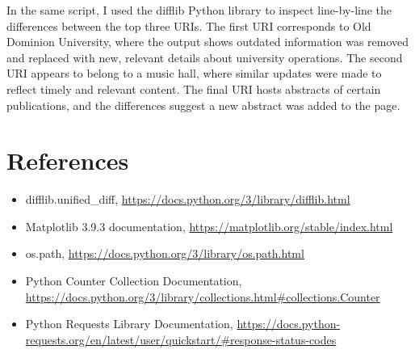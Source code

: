 \documentclass[12pt]{article}
\begin{document}
In the same script, I used the difflib Python library to inspect line-by-line the differences between the top three URIs. The first URI corresponds to Old Dominion University, where the output shows outdated information was removed and replaced with new, relevant details about university operations. The second URI appears to belong to a music hall, where similar updates were made to reflect timely and relevant content. The final URI hosts abstracts of certain publications, and the differences suggest a new abstract was added to the page.


\clearpage

\section*{References}

\begin{itemize}
    \item {difflib.unified\_diff, \url{https://docs.python.org/3/library/difflib.html}}
    \item {Matplotlib 3.9.3 documentation, \url{https://matplotlib.org/stable/index.html}}
    \item {os.path, \url{https://docs.python.org/3/library/os.path.html}}
    \item {Python Counter Collection Documentation, \url{https://docs.python.org/3/library/collections.html#collections.Counter}}
    \item {Python Requests Library Documentation, \url{https://docs.python-requests.org/en/latest/user/quickstart/#response-status-codes}}
\end{itemize}
\end{document}
